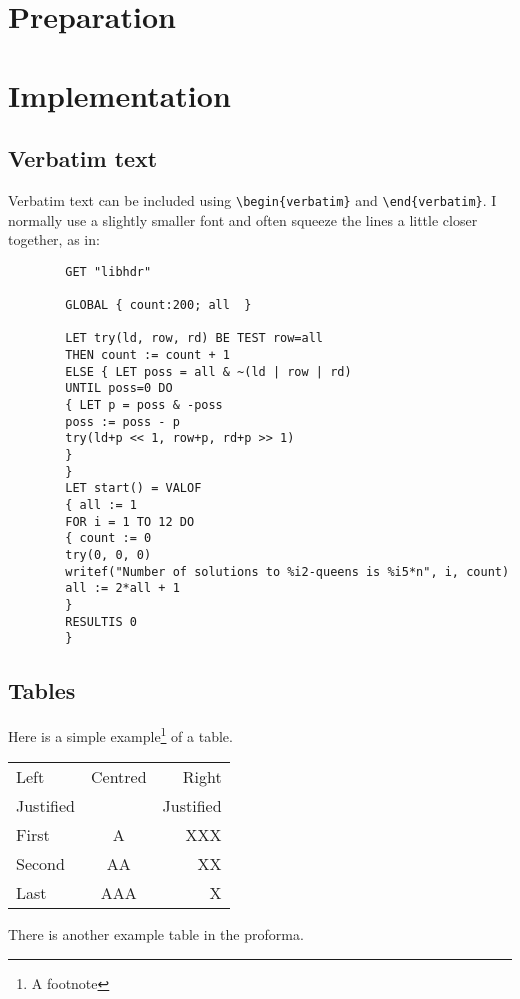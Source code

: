 \documentclass[a4paper,12pt,twoside,openright]{report}
\renewcommand{\baselinestretch}{1.1}    %
\begin{document}
	
	\chapter{Preparation}
	

	
	\chapter{Implementation}
	
	\section{Verbatim text}
	
	Verbatim text can be included using \verb|\begin{verbatim}| and
	\verb|\end{verbatim}|. I normally use a slightly smaller font and
	often squeeze the lines a little closer together, as in:
	
	{\renewcommand{\baselinestretch}{0.8}\small
		\begin{verbatim}
		GET "libhdr"
		
		GLOBAL { count:200; all  }
		
		LET try(ld, row, rd) BE TEST row=all
		THEN count := count + 1
		ELSE { LET poss = all & ~(ld | row | rd)
		UNTIL poss=0 DO
		{ LET p = poss & -poss
		poss := poss - p
		try(ld+p << 1, row+p, rd+p >> 1)
		}
		}
		LET start() = VALOF
		{ all := 1
		FOR i = 1 TO 12 DO
		{ count := 0
		try(0, 0, 0)
		writef("Number of solutions to %i2-queens is %i5*n", i, count)
		all := 2*all + 1
		}
		RESULTIS 0
		}
		\end{verbatim}
	}
	
	\section{Tables}
	
	\begin{samepage}
		Here is a simple example\footnote{A footnote} of a table.
		
		\begin{center}
			\begin{tabular}{l|c|r}
				Left      & Centred & Right \\
				Justified &         & Justified \\[3mm]
				First     & A       & XXX \\
				Second    & AA      & XX  \\
				Last      & AAA     & X   \\
			\end{tabular}
		\end{center}
		
		\noindent
		There is another example table in the proforma.
	\end{samepage}
	
\end{document}
